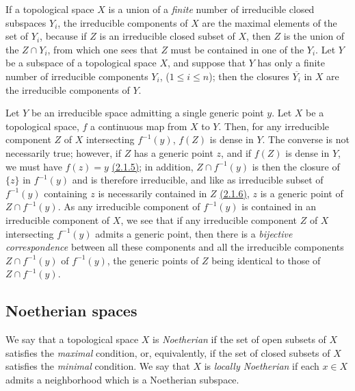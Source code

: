 \begin{env}[2.1.7]
\label{env-0.2.1.7}
If a topological space $X$ is a union of a {\em finite} number of irreducible
closed subspaces $Y_i$, the irreducible components of $X$ are the maximal
elements of the set of $Y_i$, because if $Z$ is an irreducible closed subset of
$X$, then $Z$ is the union of the $Z\cap Y_i$, from which one sees that $Z$ must
be contained in one of the $Y_i$. Let $Y$ be a subspace of a topological space
$X$, and suppose that $Y$ has only a finite number of irreducible components
$Y_i$, ($1\leqslant i\leqslant n$); then the closures $\overline{Y_i}$ in $X$
are the irreducible components of $Y$.
\end{env}

\begin{env}[2.1.8]
\label{env-0.2.1.8}
Let $Y$ be an irreducible space admitting a single generic point $y$. Let $X$ be
a topological space, $f$ a continuous map from $X$ to $Y$. Then, for any
irreducible component $Z$ of $X$ intersecting $f^{-1}(y)$, $f(Z)$ is dense in
$Y$. The converse is not necessarily true; however, if $Z$ has a generic point
$z$, and if $f(Z)$ is dense in $Y$, we must have $f(z)=y$ \hyperref[env-0.2.1.5]{(2.1.5)}; in
addition, $Z\cap f^{-1}(y)$ is then the closure of $\{z\}$ in $f^{-1}(y)$ and is
therefore irreducible, and like as irreducible subset of $f^{-1}(y)$ containing
$z$ is necessarily contained in $Z$ \hyperref[env-0.2.1.6]{(2.1.6)}, $z$ is a generic point of
$Z\cap f^{-1}(y)$. As any irreducible component of $f^{-1}(y)$ is contained in
an irreducible component of $X$, we see that if any irreducible component $Z$ of
$X$ intersecting $f^{-1}(y)$ admits a generic point, then there is a
{\em bijective correspondence} between all these components and all the
irreducible components $Z\cap f^{-1}(y)$ of $f^{-1}(y)$, the generic points of
$Z$ being identical to those of $Z\cap f^{-1}(y)$.
\end{env}

\subsection{Noetherian spaces}
\label{subsection-noetherian-spaces}

\begin{env}[2.2.1]
\label{env-0.2.2.1}
We say that a topological space $X$ is {\em Noetherian} if the set of open
subsets of $X$ satisfies the {\em maximal} condition, or, equivalently, if the
set of closed subsets of $X$ satisfies the {\em minimal} condition. We say that
$X$ is {\em locally Noetherian} if each $x\in X$ admits a neighborhood which is
a Noetherian subspace.
\end{env}

